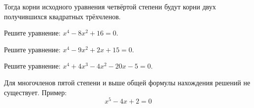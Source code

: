\documentclass{article}
\begin{document}
    Тогда корни исходного уравнения четвёртой степени будут корни двух получившихся квадратных трёхчленов.

    \begin{enumerate_boxed}

        \item Решите уравнение: $x^4 - 8x^2 + 16 = 0.$

        \item Решите уравнение: $x^4 - 9x^2 + 2x + 15 = 0.$

        \item Решите уравнение: $x^4 + 4x^3 - 4x^2 - 20x - 5 = 0.$

    \end{enumerate_boxed}

    Для многочленов пятой степени и выше общей формулы нахождения решений не существует.
    Пример:
    \[x^5 - 4x + 2 = 0\]
\end{document}
